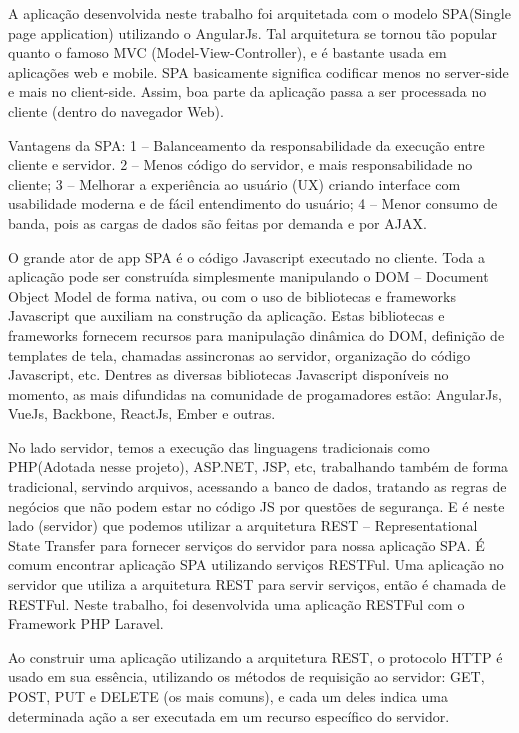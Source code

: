 A aplicação desenvolvida neste trabalho foi arquitetada com o modelo SPA(Single page application) utilizando o AngularJs. Tal arquitetura se tornou tão popular quanto o famoso MVC (Model-View-Controller), e é bastante usada em aplicações web e mobile. SPA basicamente significa codificar menos no server-side e mais no client-side. Assim, boa parte da aplicação passa a ser processada no cliente (dentro do navegador Web).


Vantagens da SPA:
1 – Balanceamento da responsabilidade da execução entre cliente e servidor.
2 – Menos código do servidor, e mais responsabilidade no cliente;
3 – Melhorar a experiência ao usuário (UX) criando interface com usabilidade moderna e de fácil entendimento do usuário;
4 – Menor consumo de banda, pois as cargas de dados são feitas por demanda e por AJAX.


O grande ator de app SPA é o código Javascript executado no cliente. Toda a aplicação pode ser construída simplesmente manipulando o DOM – Document Object Model de forma nativa, ou com o uso de bibliotecas e frameworks Javascript que auxiliam na construção da aplicação. Estas bibliotecas e frameworks fornecem recursos para manipulação dinâmica do DOM, definição de templates de tela, chamadas assincronas ao servidor, organização do código Javascript, etc. Dentres as diversas bibliotecas Javascript disponíveis no momento, as mais difundidas na comunidade de progamadores estão: AngularJs, VueJs, Backbone, ReactJs, Ember e outras.


No lado servidor, temos a execução das linguagens tradicionais como PHP(Adotada nesse projeto), ASP.NET, JSP, etc, trabalhando também de forma tradicional, servindo arquivos, acessando a banco de dados, tratando as regras de negócios que não podem estar no código JS por questões de segurança. E é neste lado (servidor) que podemos utilizar a arquitetura REST – Representational State Transfer para fornecer serviços do servidor para nossa aplicação SPA. É comum encontrar aplicação SPA utilizando serviços RESTFul. Uma aplicação no servidor que utiliza a arquitetura REST para servir serviços, então é chamada de RESTFul. Neste trabalho, foi desenvolvida uma aplicação RESTFul com o Framework PHP Laravel.


Ao construir uma aplicação utilizando a arquitetura REST, o protocolo HTTP é usado em sua essência, utilizando os métodos de requisição ao servidor: GET, POST, PUT e DELETE (os mais comuns), e cada um deles indica uma determinada ação a ser executada em um recurso específico do servidor.


